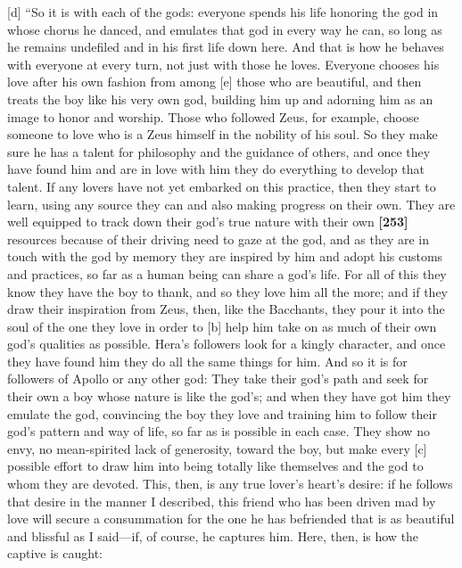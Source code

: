 {[}d{]} “So it is with each of the gods: everyone spends his life
honoring the god in whose chorus he danced, and emulates that god in
every way he can, so long as he remains undefiled and in his first life
down here. And that is how he behaves with everyone at every turn, not
just with those he loves. Everyone chooses his love after his own
fashion from among {[}e{]} those who are beautiful, and then treats the
boy like his very own god, building him up and adorning him as an image
to honor and worship. Those who followed Zeus, for example, choose
someone to love who is a Zeus himself in the nobility of his soul. So
they make sure he has a talent for philosophy and the guidance of
others, and once they have found him and are in love with him they do
everything to develop that talent. If any lovers have not yet embarked
on this practice, then they start to learn, using any source they can
and also making progress on their own. They are well equipped to track
down their god's true nature with their own {\bf {[}253{]}} resources
because of their driving need to gaze at the god, and as they are in
touch with the god by memory they are inspired by him and adopt his
customs and practices, so far as a human being can share a god's life.
For all of this they know they have the boy to thank, and so they love
him all the more; and if they draw their inspiration from Zeus, then,
like the Bacchants,
they pour it into the soul of the one they love in order to {[}b{]} help
him take on as much of their own god's qualities as possible. Hera's
followers look for a kingly character, and once they have found him they
do all the same things for him. And so it is for followers of Apollo or
any other god: They take their god's path and seek for their own a boy
whose nature is like the god's; and when they have got him they emulate
the god, convincing the boy they love and training him to follow their
god's pattern and way of life, so far as is possible in each case. They
show no envy, no mean-spirited lack of generosity, toward the boy, but
make every {[}c{]} possible effort to draw him into being totally like
themselves and the god to whom they are devoted. This, then, is any true
lover's heart's desire: if he follows that desire in the manner I
described, this friend who has been driven mad by love will secure a
consummation for the
one he has befriended that is as beautiful and blissful as I said---if,
of course, he captures him. Here, then, is how the captive is caught:

